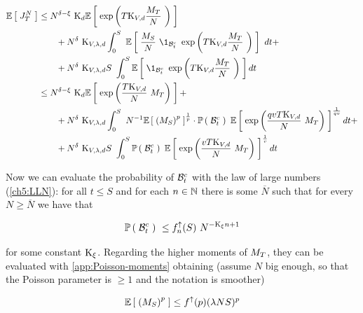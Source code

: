 \begin{equation}\label{ch6:pre-final-evaluation-on-avg-J}
	\begin{aligned}
	\E{\auxProc_T^N} 
	&\leq
	N^{\cutparameter-\xi}\
	\const_{d}
	\E{
		\exp \left(
		T
		\const_{\attraction,d}
		\frac{\hmactive_T}{N}\
		\right)
	}
	\\
	&\qquad
	+ N^{\cutparameter}\
	\const_{\attraction, \lambda,d}
	\int_0^S\
	\E{
		\frac{\hmactive_S}{N}\
		\1_{\setB_t^c}\
		\exp \left(
		T
		\const_{\attraction,d}
		\frac{\hmactive_T}{N}\
		\right)
	}\
	dt +
	\\
	&\qquad
	+ N^{\cutparameter}\
	\const_{\attraction, \lambda,d}
	S\
	\int_0^S
	\E{
		\1_{\setB_t^c}\
		\exp \left(
		T
		\const_{\attraction,d}
		\frac{\hmactive_T}{N}\
		\right)
	}
	dt
	\\
	&\leq
	N^{\cutparameter-\xi}\
	\const_{d}
	\E{
		\exp \left(
		\frac{T
			\const_{\attraction,d}
			}{N}\
		\hmactive_T
		\right)
	} +
	\\
	&\qquad
	+ N^{\cutparameter}\
	\const_{\attraction, \lambda,d}
	\int_0^S\
	N^{-1}
\E{
	\left(\hmactive_S
	\right)^p
}^{\frac{1}{p}}
\cdot
\PrbOf{\setB_t^c}\
\E{
	\exp \left(
	\frac{qvT
		\const_{\attraction,d}
		}{N}\
	\hmactive_T
	\right)
}^\frac{1}{qv}
	dt +
	\\
	&\qquad
	+ N^{\cutparameter}\
	\const_{\attraction, \lambda,d}
	S\
	\int_0^S
\PrbOf{\setB_t^c}\
\E{
	\exp \left(
	\frac{vT
		\const_{\attraction,d}
		}{N}\
	\hmactive_T
	\right)
}^{\frac{1}{v}}
	dt
\end{aligned}
\end{equation}

Now we can evaluate the probability of $\mathcal{B}_t^c$ with the law of large numbers (\ref{ch5:LLN}): for all $t\leq S$ and for each $n\in \mathbb{N}$ there is some $\overline{N}$ such that for every $N \geq \overline{N}$ we have that

\begin{equation*}
	\PrbOf{\setB_t^c}\ 
	\leq 
	\Fup_n(S)\
	N^{-\const_\xi n + 1}
\end{equation*}

for some constant $\text{K}_\xi$.
Regarding the higher moments of $M_T$, they can be evaluated with \ref{app:Poisson-moments} obtaining (assume $N$ big enough, so that the Poisson parameter is $\geq 1$ and the notation is smoother)

\begin{equation*}
	\mathbb{E} \left[ \; 
		\left(M_S
		\right)^p
	 \; \right] \leq
	f^\uparrow(p) (\lambda N S)^p
\end{equation*}

